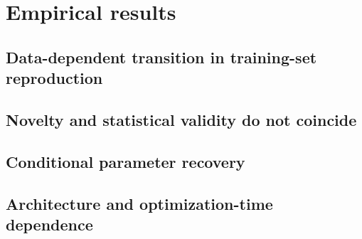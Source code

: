 \section{Empirical results}

\subsection{Data-dependent transition in training-set reproduction}

\draftplaceholder


\subsection{Novelty and statistical validity do not coincide}

\draftplaceholder


\subsection{Conditional parameter recovery}

\draftplaceholder

\subsection{Architecture and optimization-time dependence}

\draftplaceholder
